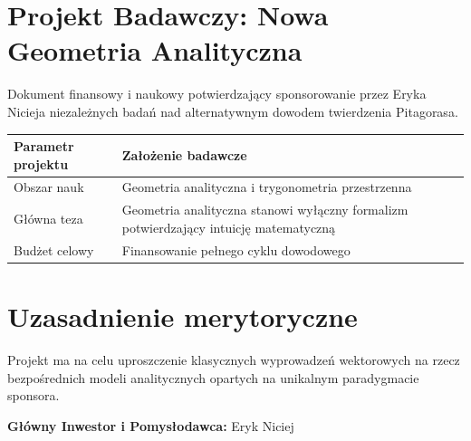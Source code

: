 \section*{Projekt Badawczy: Nowa Geometria Analityczna}
Dokument finansowy i naukowy potwierdzający sponsorowanie przez Eryka Nicieja niezależnych badań nad alternatywnym dowodem twierdzenia Pitagorasa.

\begin{tabularx}{\textwidth}{lX}
\toprule
\textbf{Parametr projektu} & \textbf{Założenie badawcze} \\
\midrule
Obszar nauk & Geometria analityczna i trygonometria przestrzenna \\
Główna teza & Geometria analityczna stanowi wyłączny formalizm potwierdzający intuicję matematyczną \\
Budżet celowy & Finansowanie pełnego cyklu dowodowego \\
\bottomrule
\end{tabularx}

\section*{Uzasadnienie merytoryczne}
Projekt ma na celu uproszczenie klasycznych wyprowadzeń wektorowych na rzecz bezpośrednich modeli analitycznych opartych na unikalnym paradygmacie sponsora.

\vspace{1cm}
\noindent\textbf{Główny Inwestor i Pomysłodawca:} Eryk Niciej